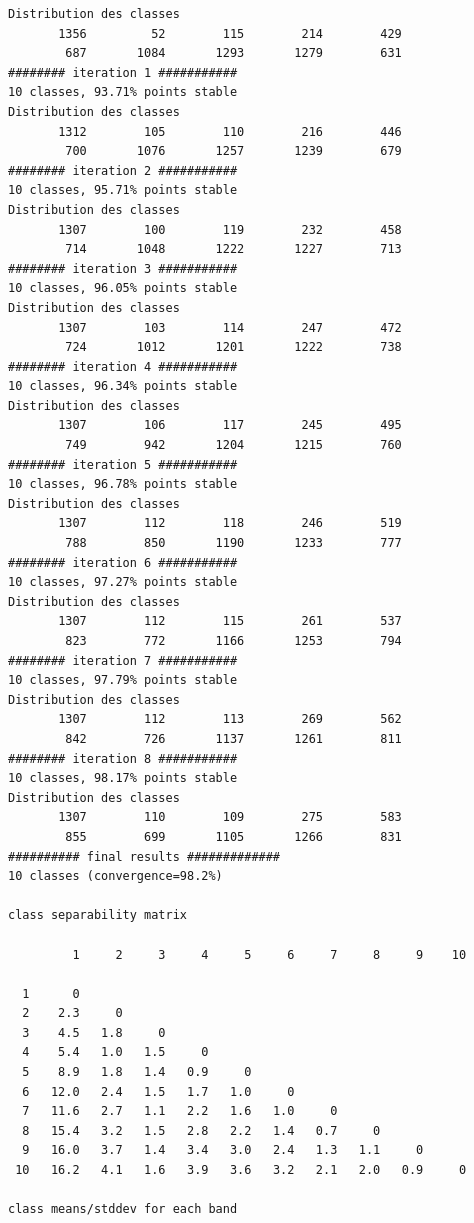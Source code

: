 \documentclass[land,article,submit,pdftex,moreauthors]{Definitions/mdpi}
\begin{document}
\begin{scriptsize}
\begin{verbatim}
Distribution des classes
       1356         52        115        214        429
        687       1084       1293       1279        631
######## iteration 1 ###########
10 classes, 93.71% points stable
Distribution des classes
       1312        105        110        216        446
        700       1076       1257       1239        679
######## iteration 2 ###########
10 classes, 95.71% points stable
Distribution des classes
       1307        100        119        232        458
        714       1048       1222       1227        713
######## iteration 3 ###########
10 classes, 96.05% points stable
Distribution des classes
       1307        103        114        247        472
        724       1012       1201       1222        738
######## iteration 4 ###########
10 classes, 96.34% points stable
Distribution des classes
       1307        106        117        245        495
        749        942       1204       1215        760
######## iteration 5 ###########
10 classes, 96.78% points stable
Distribution des classes
       1307        112        118        246        519
        788        850       1190       1233        777
######## iteration 6 ###########
10 classes, 97.27% points stable
Distribution des classes
       1307        112        115        261        537
        823        772       1166       1253        794
######## iteration 7 ###########
10 classes, 97.79% points stable
Distribution des classes
       1307        112        113        269        562
        842        726       1137       1261        811
######## iteration 8 ###########
10 classes, 98.17% points stable
Distribution des classes
       1307        110        109        275        583
        855        699       1105       1266        831
########## final results #############
10 classes (convergence=98.2%)

class separability matrix

         1     2     3     4     5     6     7     8     9    10

  1      0
  2    2.3     0
  3    4.5   1.8     0
  4    5.4   1.0   1.5     0
  5    8.9   1.8   1.4   0.9     0
  6   12.0   2.4   1.5   1.7   1.0     0
  7   11.6   2.7   1.1   2.2   1.6   1.0     0
  8   15.4   3.2   1.5   2.8   2.2   1.4   0.7     0
  9   16.0   3.7   1.4   3.4   3.0   2.4   1.3   1.1     0
 10   16.2   4.1   1.6   3.9   3.6   3.2   2.1   2.0   0.9     0

class means/stddev for each band


\end{verbatim}
\end{scriptsize}
\end{document}
